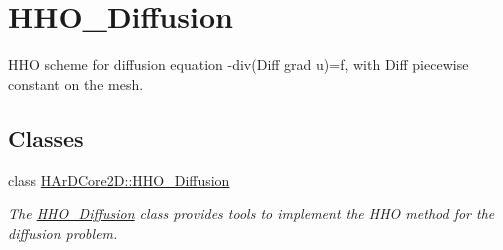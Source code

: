 \hypertarget{group__HHO__Diffusion}{}\section{H\+H\+O\+\_\+\+Diffusion}
\label{group__HHO__Diffusion}


H\+HO scheme for diffusion equation -\/div(Diff grad u)=f, with Diff piecewise constant on the mesh.  


\subsection*{Classes}
\begin{DoxyCompactItemize}
\item 
class \hyperlink{classHArDCore2D_1_1HHO__Diffusion}{H\+Ar\+D\+Core2\+D\+::\+H\+H\+O\+\_\+\+Diffusion}
\begin{DoxyCompactList}\small\item\em The \hyperlink{classHArDCore2D_1_1HHO__Diffusion}{H\+H\+O\+\_\+\+Diffusion} class provides tools to implement the H\+HO method for the diffusion problem. \end{DoxyCompactList}\end{DoxyCompactItemize}
